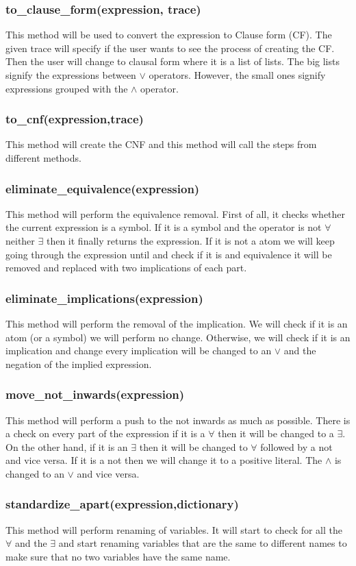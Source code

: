 \subsubsection{to\_clause\_form(expression, trace)}
This method will be used to convert the expression to Clause form (CF). The given trace will specify if the user wants to see the process of creating the CF. Then the user will change to clausal form where it is a list of lists. The big lists signify the expressions between $\vee$ operators. However, the small ones signify expressions grouped with the $\wedge$ operator.
\subsubsection{to\_cnf(expression,trace)}
This method will create the CNF and this method will call the steps from different methods.
\subsubsection{eliminate\_equivalence(expression)}
This method will perform the equivalence removal. First of all, it checks whether the current expression is a symbol. If it is a symbol and the operator is not $\forall$ neither $\exists$ then it finally returns the expression. If it is not a atom we will keep going through the expression until and check if it is and equivalence it will be removed and replaced with two implications of each part.
\subsubsection{eliminate\_implications(expression)}
This method will perform the removal of the implication. We will check if it is an atom (or a symbol) we will perform no change. Otherwise, we will check if it is an implication and change every implication will be changed to an $\vee$ and the negation of the implied expression.
\subsubsection{move\_not\_inwards(expression)}
This method will perform a push to the not inwards as much as possible. There is a check on every part of the expression if it is a $\forall$ then it will be changed to a $\exists$. On the other hand, if it is an $\exists$ then it will be changed to $\forall$ followed by a not and vice versa. If it is a not then we will change it to a positive literal. The $\wedge$ is changed to an $\vee$ and vice versa.
\subsubsection{standardize\_apart(expression,dictionary)}
This method will perform renaming of variables. It will start to check for all the $\forall$ and the $\exists$ and start renaming variables that are the same to different names to make sure that no two variables have the same name.
